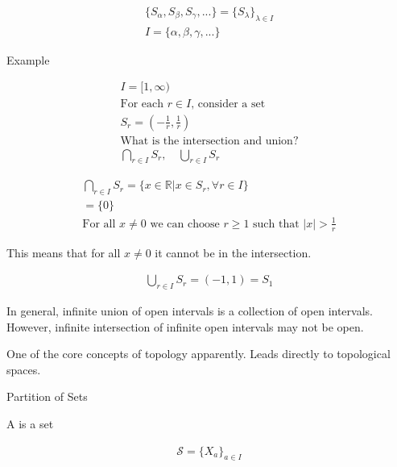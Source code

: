 \documentclass{report}
\begin{document}
\begin{description}
        \begin{gather}
            \{S_\alpha, S_\beta, S_\gamma, ... \} = \{S_\lambda \}_{\lambda \in I}\\ 
            I = \{\alpha, \beta, \gamma, ... \}
        \end{gather}


    \item Example

        \begin{gather}
            I = [1, \infty)\\
            \text{For each $r \in I$, consider a set}\\
            S_r = (-\frac{1}{r}, \frac{1}{r})\\
            \text{What is the intersection and union?}\\
            \bigcap_{r\in I}S_r,\quad \bigcup_{r\in I}S_r
        \end{gather}

        \begin{gather}
            \bigcap_{r \in I} S_r = \{x \in \mathbb{R} | x \in S_r, \forall r \in I \}\\
            = \{ 0 \}\\
            \text{For all $x \neq 0$ we can choose $r \ge 1$ such
            that $|x| > \frac{1}{r}$}
        \end{gather}

        This means that for all $x \neq 0$ it cannot be in the
        intersection.

        \begin{gather}
            \bigcup_{r \in I} S_r = (-1, 1) = S_1 
        \end{gather}

        In general, infinite union of open intervals is a collection
        of open intervals. However, infinite intersection of infinite
        open intervals may not be open.

        \begin{mdframed}
            One of the core concepts of topology apparently. Leads
            directly to topological spaces.
        \end{mdframed}
    
    \item Partition of Sets

        A is a set

        \begin{gather}
            \mathcal{S} = \{X_a \}_{a \in I}  
        \end{gather}


\end{description}
\end{document}
